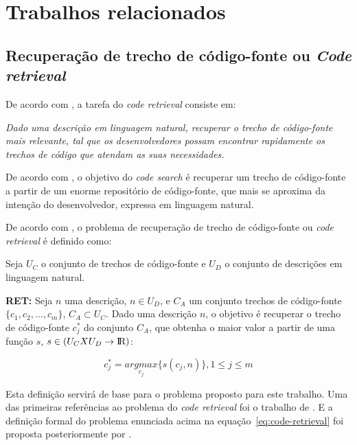 \chapter{Trabalhos relacionados}
\label{cap:trabalhos-relacionados}



\section{Recuperação de trecho de código-fonte ou \textit{Code retrieval}}
\label{sec:code-retrieval}

De acordo com \cite{Chen-bi-variational-autoencoder:2018}, a tarefa do \textit{code retrieval} consiste em:

\emph{Dado uma descrição em linguagem natural, recuperar o trecho de código-fonte mais relevante, tal que os desenvolvedores possam encontrar rapidamente os trechos de código que atendam as suas necessidades.}

De acordo com \cite{cambronero-deep-learning-code-search:2019}, o objetivo do \textit{code search} é recuperar um trecho de código-fonte a partir de um enorme repositório de código-fonte, que mais se aproxima da intenção do desenvolvedor, expressa em linguagem natural. 

De acordo com \cite{iyer-etal-2016-summarizing}, o problema de recuperação de trecho de código-fonte ou \textit{code retrieval} é definido como:

Seja $U_{C}$ o conjunto de trechos de código-fonte e $U_{D}$ o conjunto de descrições em linguagem natural. 

\textbf{RET:} Seja $n$ uma descrição, $n \in U_{D}$, e $C_{A}$ um conjunto trechos de código-fonte $\{c_{1}, c_{2}, ..., c_{m}\}$, $C_{A} \subset U_{C}$. Dado uma descrição $n$, o objetivo é recuperar o trecho de código-fonte $c_{j}^{*}$ do conjunto $C_{A}$, que obtenha o maior valor a partir de uma função $s$, $s \in (U_{C} X U_{D} \rightarrow \rm I\!R)$:

\begin{equation}\label{eq:code-retrieval}
c_{j}^{*} = \underset{c_{j}}{argmax} \{s(c_{j} , n)\}, 1 \leq j \leq m   
\end{equation}


Esta definição servirá de base para o problema proposto para este trabalho. Uma das primeiras referências ao problema do \textit{code retrieval} foi o trabalho de \cite{Allamanis-bimodal-source-code-natural-language:2015}. E a definição formal do problema enunciada acima na equação~\ref{eq:code-retrieval} foi proposta posteriormente por \cite{iyer-etal-2016-summarizing}. 

